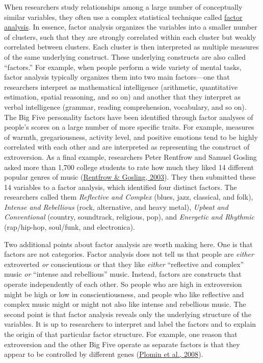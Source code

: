 \documentclass[
]{krantz}
\begin{document}
When researchers study relationships among a large number of conceptually similar variables, they often use a complex statistical technique called \protect\hyperlink{factor-analysis}{factor analysis}. In essence, factor analysis organizes the variables into a smaller number of clusters, such that they are strongly correlated within each cluster but weakly correlated between clusters. Each cluster is then interpreted as multiple measures of the same underlying construct. These underlying constructs are also called ``factors.'' For example, when people perform a wide variety of mental tasks, factor analysis typically organizes them into two main factors---one that researchers interpret as mathematical intelligence (arithmetic, quantitative estimation, spatial reasoning, and so on) and another that they interpret as verbal intelligence (grammar, reading comprehension, vocabulary, and so on). The Big Five personality factors have been identified through factor analyses of people's scores on a large number of more specific traits. For example, measures of warmth, gregariousness, activity level, and positive emotions tend to be highly correlated with each other and are interpreted as representing the construct of extroversion. As a final example, researchers Peter Rentfrow and Samuel Gosling asked more than 1,700 college students to rate how much they liked 14 different popular genres of music (\protect\hyperlink{ref-rentfrow2003re}{Rentfrow \& Gosling, 2003}). They then submitted these 14 variables to a factor analysis, which identified four distinct factors. The researchers called them \emph{Reflective and Complex} (blues, jazz, classical, and folk), \emph{Intense and Rebellious} (rock, alternative, and heavy metal), \emph{Upbeat and Conventional} (country, soundtrack, religious, pop), and \emph{Energetic and Rhythmic} (rap/hip-hop, soul/funk, and electronica).

Two additional points about factor analysis are worth making here. One is that factors are not categories. Factor analysis does not tell us that people are \emph{either} extroverted \emph{or} conscientious or that they like \emph{either} ``reflective and complex'' music \emph{or} ``intense and rebellious'' music. Instead, factors are constructs that operate independently of each other. So people who are high in extroversion might be high or low in conscientiousness, and people who like reflective and complex music might or might not also like intense and rebellious music. The second point is that factor analysis reveals only the underlying structure of the variables. It is up to researchers to interpret and label the factors and to explain the origin of that particular factor structure. For example, one reason that extroversion and the other Big Five operate as separate factors is that they appear to be controlled by different genes (\protect\hyperlink{ref-plomin2008behavioral}{Plomin et al., 2008}).
\end{document}
